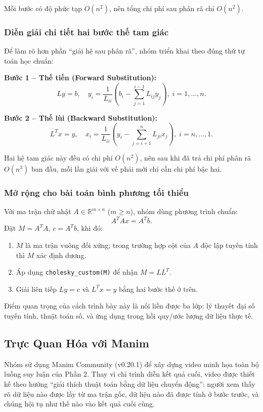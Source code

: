 \documentclass[a4paper]{article}
\begin{document}
Mỗi bước có độ phức tạp $O(n^2)$, nên tổng chi phí sau phân rã chỉ $O(n^2)$.

\subsubsection{Diễn giải chi tiết hai bước thế tam giác}

Để làm rõ hơn phần ``giải hệ sau phân rã'', nhóm triển khai theo đúng thứ tự toán học chuẩn:

\textbf{Bước 1 -- Thế tiến (Forward Substitution):}
\[
L y = b,
\quad
y_i = \frac{1}{L_{ii}}\left(b_i - \sum_{j=1}^{i-1}L_{ij}y_j\right),\; i=1,\ldots,n.
\]

\textbf{Bước 2 -- Thế lùi (Backward Substitution):}
\[
L^T x = y,
\quad
x_i = \frac{1}{L_{ii}}\left(y_i - \sum_{j=i+1}^{n}L_{ji}x_j\right),\; i=n,\ldots,1.
\]

Hai hệ tam giác này đều có chi phí $O(n^2)$, nên sau khi đã trả chi phí phân rã $O(n^3)$ ban đầu, mỗi lần giải với vế phải mới chỉ cần chi phí bậc hai.

\subsubsection{Mở rộng cho bài toán bình phương tối thiểu}

Với ma trận chữ nhật $A\in\mathbb{R}^{m\times n}$ ($m\ge n$), nhóm dùng phương trình chuẩn:
\[
A^TAx = A^Tb.
\]
Đặt $M=A^TA$, $c=A^Tb$, khi đó:
\begin{enumerate}
    \item $M$ là ma trận vuông đối xứng; trong trường hợp cột của $A$ độc lập tuyến tính thì $M$ xác định dương.
    \item Áp dụng \texttt{cholesky\_custom(M)} để nhận $M=LL^T$.
    \item Giải liên tiếp $Ly=c$ và $L^Tx=y$ bằng hai bước thế ở trên.
\end{enumerate}

Điểm quan trọng của cách trình bày này là nối liền được ba lớp: lý thuyết đại số tuyến tính, thuật toán số, và ứng dụng trong hồi quy/ước lượng dữ liệu thực tế.

\subsection{Trực Quan Hóa với Manim}

Nhóm sử dụng Manim Community (v0.20.1) để xây dựng video minh họa toàn bộ luồng suy luận của Phần 2. Thay vì chỉ trình diễn kết quả cuối, video được thiết kế theo hướng ``giải thích thuật toán bằng dữ liệu chuyển động'': người xem thấy rõ dữ liệu nào được lấy từ ma trận gốc, dữ liệu nào đã được tính ở bước trước, và chúng hội tụ như thế nào vào kết quả cuối cùng.
\end{document}

